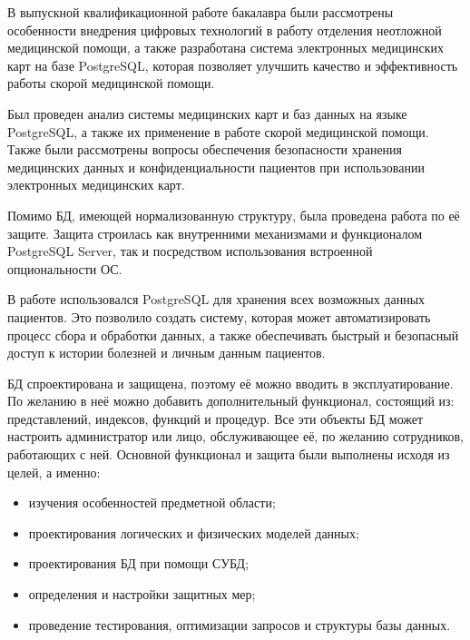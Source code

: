 \conclusion

В выпускной квалификационной работе бакалавра были рассмотрены особенности внедрения цифровых технологий в работу отделения неотложной медицинской помощи, а также разработана система электронных медицинских карт на базе PostgreSQL, которая позволяет улучшить качество и эффективность работы скорой медицинской помощи.

Был проведен анализ системы медицинских карт и баз данных на языке PostgreSQL, а также их применение в работе скорой медицинской помощи. Также были рассмотрены вопросы обеспечения безопасности хранения медицинских данных и конфиденциальности пациентов при использовании электронных медицинских карт.

Помимо БД, имеющей нормализованную структуру, была проведена работа по её защите. Защита строилась как внутренними механизмами и функционалом PostgreSQL Server, так и посредством использования встроенной опциональности ОС.

В работе использовался PostgreSQL для хранения всех возможных данных пациентов. Это позволило создать систему, которая может автоматизировать процесс сбора и обработки данных, а также обеспечивать быстрый и безопасный доступ к истории болезней и личным данным пациентов.

БД спроектирована и защищена, поэтому её можно вводить в эксплуатирование. По желанию в неё можно добавить дополнительный функционал, состоящий из: представлений, индексов, функций и процедур. Все эти объекты БД может настроить администратор или лицо, обслуживающее её, по желанию сотрудников, работающих с ней. Основной функционал и защита были выполнены исходя из целей, а именно:

\begin{itemize}
    \item изучения особенностей предметной области;
    \item проектирования логических и физических моделей данных;
    \item проектирования БД при помощи СУБД;
    \item определения и настройки защитных мер;
    \item проведение тестирования, оптимизации запросов и структуры базы данных.
\end{itemize}